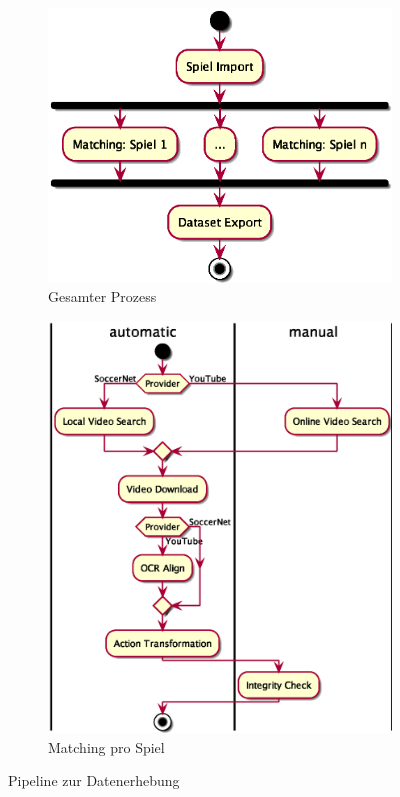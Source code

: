\begin{figure}
    \centering
    \begin{subfigure}[b]{.5\textwidth}
        \centering
        \includegraphics[width=.8\linewidth]{fig/collection.eps}
        \caption{Gesamter Prozess}
        \label{fig:collection-pipeline_a}
    \end{subfigure}%
    \begin{subfigure}[b]{.5\textwidth}
        \centering
        \includegraphics[width=.95\linewidth]{fig/collection-pipeline.eps}
        \caption{Matching pro Spiel}
        \label{fig:collection-pipeline_b}
    \end{subfigure}
    \caption{Pipeline zur Datenerhebung}
    \label{fig:collection-pipeline}
\end{figure}

